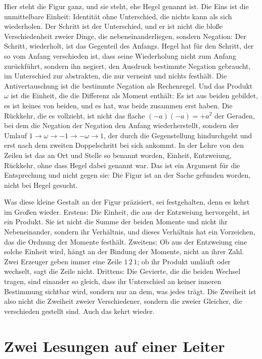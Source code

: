 \documentclass[11pt,a4paper]{article}
\newcommand{\Randlesart}{\marginpar{\raggedright\footnotesize\textcolor{lesart}{$\bigcirc$\,Lesart}}}
\begin{document}
\Randlesart Hier steht die Figur ganz, und sie steht, ehe Hegel genannt ist. Die Eins ist die unmittelbare Einheit: Identität ohne Unterschied, die nichts kann als sich wiederholen. Der Schritt ist der Unterschied, und er ist nicht die bloße Verschiedenheit zweier Dinge, die nebeneinanderliegen, sondern Negation: Der Schritt, wiederholt, ist das Gegenteil des Anfangs. Hegel hat für den Schritt, der so vom Anfang verschieden ist, dass seine Wiederholung nicht zum Anfang zurückführt, sondern ihn negiert, den Ausdruck bestimmte Negation gebraucht, im Unterschied zur abstrakten, die nur verneint und nichts festhält. Die Antivertauschung ist die bestimmte Negation als Rechenregel. Und das Produkt $\omega$ ist die Einheit, die die Differenz als Moment enthält: Es ist aus beiden gebildet, es ist keines von beiden, und es hat, was beide zusammen erst haben. Die Rückkehr, die es vollzieht, ist nicht das flache $(-a)(-a)=+a^2$ der Geraden, bei dem die Negation der Negation den Anfang wiederherstellt, sondern der Umlauf $1\to\omega\to-1\to-\omega\to1$, der durch die Gegenstellung hindurchgeht und erst nach dem zweiten Doppelschritt bei sich ankommt. In der Lehre von den Zeilen ist das an Ort und Stelle so benannt worden, Einheit, Entzweiung, Rückkehr, ohne dass Hegel dabei genannt war. Das ist ein Argument für die Entsprechung und nicht gegen sie: Die Figur ist an der Sache gefunden worden, nicht bei Hegel gesucht.

Was diese kleine Gestalt an der Figur präzisiert, sei festgehalten, denn es kehrt im Großen wieder. Erstens: Die Einheit, die aus der Entzweiung hervorgeht, ist ein Produkt. Sie ist nicht die Summe der beiden Momente und nicht ihr Nebeneinander, sondern ihr Verhältnis, und dieses Verhältnis hat ein Vorzeichen, das die Ordnung der Momente festhält. Zweitens: Ob aus der Entzweiung eine solche Einheit wird, hängt an der Bindung der Momente, nicht an ihrer Zahl. Zwei Erzeuger geben immer eine Zeile $1\,2\,1$; ob ihr Produkt umläuft oder wechselt, sagt die Zeile nicht. Drittens: Die Gevierte, die die beiden Wechsel tragen, sind einander so gleich, dass ihr Unterschied an keiner inneren Bestimmung sichtbar wird, sondern nur an dem, was jedes trägt. Die Zweiheit ist also nicht die Zweiheit zweier Verschiedener, sondern die zweier Gleicher, die verschieden gestellt sind. Auch das kehrt wieder.

\section{Zwei Lesungen auf einer Leiter}
\label{sec:lesungen}
\end{document}

